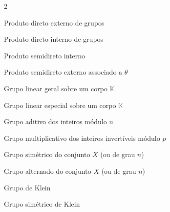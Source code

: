 \documentclass[16pt,openany]{book}
\theoremstyle{definition}
\begin{document}
\begin{multicols}{2}
    \begin{description}[leftmargin=2.2cm, labelwidth=1.8cm, labelsep=0.4cm, itemsep=0.3cm, font=\normalfont]
        \item[{ $\prod G_i$ }] Produto direto externo de grupos
        \item[{ $\bigodot H_i$ }] Produto direto interno de grupos
        \item[{ $H \rtimes K$ }] Produto semidireto interno
        \item[{ $H \rtimes_\theta K$ }] Produto semidireto externo associado a $\theta$
    \end{description}
    

    \begin{description}[leftmargin=2.2cm, labelwidth=1.8cm, labelsep=0.4cm, itemsep=0.3cm, font=\normalfont]
        \item[{ $GL_n(\mathbb{K})$ }] Grupo linear geral sobre um corpo $\mathbb{K}$
        \item[{ $SL_n(\mathbb{K})$ }] Grupo linear especial sobre um corpo $\mathbb{K}$
        \item[{ $\mathbb{Z}/n\mathbb{Z}$ }] Grupo aditivo dos inteiros módulo $n$
        \item[{ ($\mathbb{Z}/p\mathbb{Z})^{*}$ }] Grupo multiplicativo dos inteiros invertíveis módulo $p$
        \item[{ $\mathfrak{S}_X$ ou $\mathfrak{S}_n$ }] Grupo simétrico do conjunto $X$ (ou de grau $n$)
        \item[{ $\mathfrak{A}_X$ ou $\mathfrak{A}_n$ }] Grupo alternado do conjunto $X$ (ou de grau $n$)
        \item[{ $\mathcal{K}$ }] Grupo de Klein
        \item[{ $\mathfrak{K}$ }] Grupo simétrico de Klein
    \end{description}
    

\end{multicols}
\end{document}
